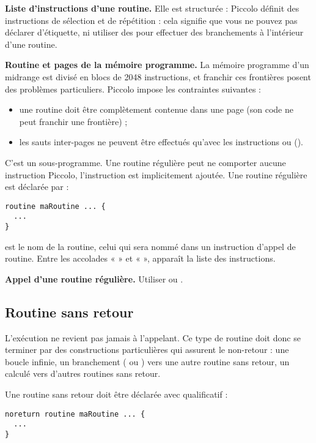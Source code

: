 \textbf{Liste d’instructions d’une routine.} Elle est structurée : Piccolo définit des instructions de sélection et de répétition : cela signifie que vous ne pouvez pas déclarer d’étiquette, ni utiliser des  pour effectuer des branchements à l’intérieur d’une routine.

\textbf{Routine et pages de la mémoire programme.} La mémoire programme d’un midrange est divisé en blocs de 2048 instructions, et franchir ces frontières posent des problèmes particuliers. Piccolo impose les contraintes suivantes :\begin{itemize}
  \item une routine doit être complètement contenue dans une page (son code ne peut franchir une frontière) ;
  \item les sauts inter-pages ne peuvent être effectués qu’avec les instructions  ou  ().
\end{itemize}


C'est un sous-programme. Une routine régulière peut ne comporter aucune instruction Piccolo, l'instruction  est implicitement ajoutée. Une routine régulière est déclarée par :
\begin{lstlisting}[language=piccolo]
routine maRoutine ... {
  ...
}
\end{lstlisting}

 est le nom de la routine, celui qui sera nommé dans un instruction d’appel de routine. Entre les accolades « \piccolo{\{} » et « \piccolo{\}} », apparaît la liste des instructions.

\textbf{Appel d’une routine régulière.} Utiliser  ou .

\subsection{Routine sans retour}

L’exécution ne revient pas jamais à l’appelant. Ce type de routine doit donc se terminer par des constructions particulières qui assurent le non-retour : une boucle infinie, un branchement ( ou ) vers une autre routine sans retour, un  calculé vers d’autres routines sans retour.

Une routine sans retour doit être déclarée avec qualificatif  :
\begin{lstlisting}[language=piccolo]
noreturn routine maRoutine ... {
  ...
}
\end{lstlisting}

